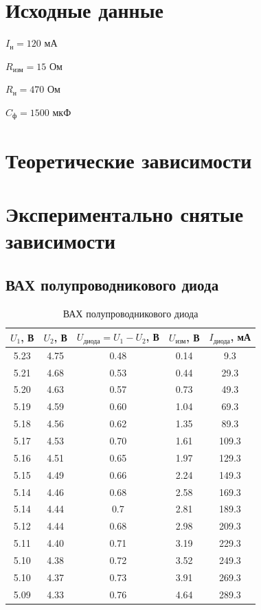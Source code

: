 \section{Исходные данные}

$I_\text{н} = 120$ мА

$R_\text{изм} = 15$ Ом

$R_\text{н} = 470$ Ом

$C_\text{ф} = 1500$ мкФ

\section{Теоретические зависимости}



\section{Экспериментально снятые зависимости}

\subsection{ВАХ полупроводникового диода}

\begin{table}[H]
	\begin{center}
	\caption{ВАХ полупроводникового диода}
	\def\arraystretch{1.5}
		\begin{tabular}{|c|c|c|c|c|}
		\hline 
		$U_1$, В & $U_2$, В & $U_\text{диода} = U_1 - U_2$, В & $U_\text{изм}$, В & $I_\text{диода}$, мА \\ 
		\hline 
		5.23 & 4.75 & 0.48 & 0.14 & 9.3 \\ 
		\hline 
		5.21 & 4.68 & 0.53 & 0.44 & 29.3 \\ 
		\hline 
		5.20 & 4.63 & 0.57 & 0.73 & 49.3 \\ 
		\hline 
		5.19 & 4.59 & 0.60 & 1.04 & 69.3 \\ 
		\hline 
		5.18 & 4.56 & 0.62 & 1.35 & 89.3 \\ 
		\hline 
		5.17 & 4.53 & 0.70 & 1.61 & 109.3 \\ 
		\hline 
		5.16 & 4.51 & 0.65 & 1.97 & 129.3 \\ 
		\hline 
		5.15 & 4.49 & 0.66 & 2.24 & 149.3 \\ 
		\hline 
		5.14 & 4.46 & 0.68 & 2.58 & 169.3 \\ 
		\hline 
		5.14 & 4.44 & 0.7 & 2.81 & 189.3 \\ 
		\hline 
		5.12 & 4.44 & 0.68 & 2.98 & 209.3 \\ 
		\hline 
		5.11 & 4.40 & 0.71 & 3.19 & 229.3 \\ 
		\hline 
		5.10 & 4.38 & 0.72 & 3.52 & 249.3 \\ 
		\hline 
		5.10 & 4.37 & 0.73 & 3.91 & 269.3 \\ 
		\hline 
		5.09 & 4.33 & 0.76 & 4.64 & 289.3 \\ 
		\hline 
		\end{tabular} 
		\label{tab:5:1}
	\end{center}
\end{table}

